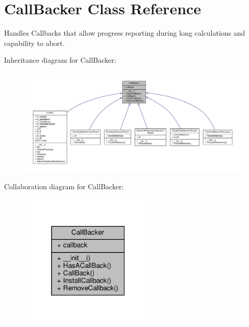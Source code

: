 \hypertarget{classSignalIntegrity_1_1CallBacker_1_1CallBacker}{}\section{Call\+Backer Class Reference}
\label{classSignalIntegrity_1_1CallBacker_1_1CallBacker}


Handles Callbacks that allow progress reporting during long calculations and capability to abort.  




Inheritance diagram for Call\+Backer\+:\nopagebreak
\begin{figure}[H]
\begin{center}
\leavevmode
\includegraphics[width=350pt]{classSignalIntegrity_1_1CallBacker_1_1CallBacker__inherit__graph}
\end{center}
\end{figure}


Collaboration diagram for Call\+Backer\+:\nopagebreak
\begin{figure}[H]
\begin{center}
\leavevmode
\includegraphics[width=187pt]{classSignalIntegrity_1_1CallBacker_1_1CallBacker__coll__graph}
\end{center}
\end{figure}
